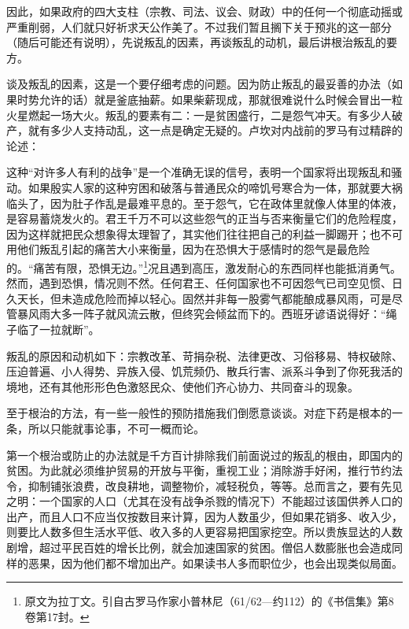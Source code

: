 \par 因此，如果政府的四大支柱（宗教、司法、议会、财政）中的任何一个彻底动摇或严重削弱，人们就只好祈求天公作美了。不过我们暂且搁下关于预兆的这一部分（随后可能还有说明），先说叛乱的因素，再谈叛乱的动机，最后讲根治叛乱的要方。
\par 谈及叛乱的因素，这是一个要仔细考虑的问题。因为防止叛乱的最妥善的办法（如果时势允许的话）就是釜底抽薪。如果柴薪现成，那就很难说什么时候会冒出一粒火星燃起一场大火。叛乱的要素有二：一是贫困盛行，二是怨气冲天。有多少人破产，就有多少人支持动乱，这一点是确定无疑的。卢坎对内战前的罗马有过精辟的论述：
\par 这种“对许多人有利的战争”是一个准确无误的信号，表明一个国家将出现叛乱和骚动。如果殷实人家的这种穷困和破落与普通民众的啼饥号寒合为一体，那就要大祸临头了，因为肚子作乱是最难平息的。至于怨气，它在政体里就像人体里的体液，是容易蓄烧发火的。君王千万不可以这些怨气的正当与否来衡量它们的危险程度，因为这样就把民众想象得太理智了，其实他们往往把自己的利益一脚踢开；也不可用他们叛乱引起的痛苦大小来衡量，因为在恐惧大于感情时的怨气是最危险的。“痛苦有限，恐惧无边。”\footnote{原文为拉丁文。引自古罗马作家小普林尼（61/62—约112）的《书信集》第8卷第17封。}况且遇到高压，激发耐心的东西同样也能抵消勇气。然而，遇到恐惧，情况则不然。任何君王、任何国家也不可因怨气已司空见惯、日久天长，但未造成危险而掉以轻心。固然并非每一股雾气都能酿成暴风雨，可是尽管暴风雨大多一阵子就风流云散，但终究会倾盆而下的。西班牙谚语说得好：“绳子临了一拉就断”。
\par 叛乱的原因和动机如下：宗教改革、苛捐杂税、法律更改、习俗移易、特权破除、压迫普遍、小人得势、异族入侵、饥荒频仍、散兵行害、派系斗争到了你死我活的境地，还有其他形形色色激怒民众、使他们齐心协力、共同奋斗的现象。
\par 至于根治的方法，有一些一般性的预防措施我们倒愿意谈谈。对症下药是根本的一条，所以只能就事论事，不可一概而论。
\par 第一个根治或防止的办法就是千方百计排除我们前面说过的叛乱的根由，即国内的贫困。为此就必须维护贸易的开放与平衡，重视工业；消除游手好闲，推行节约法令，抑制铺张浪费，改良耕地，调整物价，减轻税负，等等。总而言之，要有先见之明：一个国家的人口（尤其在没有战争杀戮的情况下）不能超过该国供养人口的出产，而且人口不应当仅按数目来计算，因为人数虽少，但如果花销多、收入少，则要比人数多但生活水平低、收入多的人更容易把国家挖空。所以贵族显达的人数剧增，超过平民百姓的增长比例，就会加速国家的贫困。僧侣人数膨胀也会造成同样的恶果，因为他们都不增加出产。如果读书人多而职位少，也会出现类似局面。
